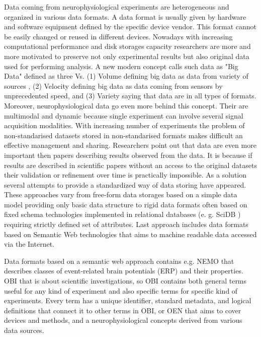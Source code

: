 \documentclass[utf8]{frontiersSCNS} %
\begin{document}
Data coming from neurophysiological experiments are heterogeneous and organized in various data formats. A data format is usually given by hardware and software equipment defined by the specific device vendor. This format cannot be easily changed or reused in different devices. Nowadays with increasing computational performance and disk storages capacity researchers are more and more motivated to preserve not only experimental results but also original data used for performing analysis. A new modern concept calls such data as "Big Data" defined as  three Vs. (1) Volume defining big data as data from variety of sources , (2) Velocity defining big data as data coming from sensors by unprecedented speed, and	(3) Variety saying that data are in all types of formats. Moreover, neurophysiological data go even more behind this concept. Their are multimodal and dynamic because single experiment can involve several signal acquisition modalities. With increasing number of experiments the problem of non-standarised datasets stored in non-standarised formats makes  difficult an effective management and sharing. Researchers point out that data are even more important then papers describing results observed from the data. It is because if results are described in scientific papers without an access to the original datasets their validation or refinement over time is practically impossible. As a solution several attempts to provide a standardized way of data storing have appeared. These approaches vary from free-form data storages based on a simple data model providing only basic data structure \citep{10.3389/fninf.2011.00016} to rigid data formats often based on fixed schema technologies implemented in relational databases (e. g. SciDB \citep{Brown:2010:OSL:1807167.1807271}) requiring strictly defined set of attributes. Last approach includes data formats based on Semantic Web technologies that aims to machine readable data accessed via the Internet. 

Data formats based on a semantic web approach contains e.g.  NEMO \citep{DouFRFMT07} that describes classes of event-related brain potentials (ERP) and their properties. OBI \citep{citeulike:7291351} that is about scientific investigations, so OBI contains both general terms useful for any kind of experiment and also specific terms for specific kind of experiments. Every term has a unique identifier, standard metadata, and logical definitions that connect it to other terms in OBI, or OEN  \citep{10.3389/conf.fninf.2014.18.00044} that aims to cover devices and methods, and a  neurophysiological concepts derived from various data sources.
\end{document}
